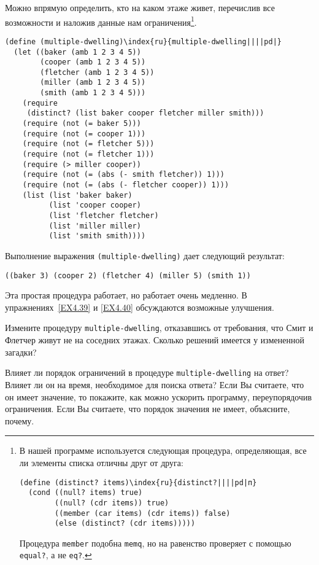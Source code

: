 Можно впрямую определить, кто на каком этаже живет,
перечислив все возможности и наложив данные нам ограничения\footnote{В 
нашей программе используется следующая процедура,
определяющая, все ли элементы списка отличны друг от друга:

\begin{Verbatim}
(define (distinct? items)\index{ru}{distinct?||||pd|п}
  (cond ((null? items) true)
        ((null? (cdr items)) true)
        ((member (car items) (cdr items)) false)
        (else (distinct? (cdr items)))))
\end{Verbatim}
Процедура {\tt member}
подобна {\tt memq}, но
на равенство проверяет с помощью {\tt equal?}, а не
{\tt eq?}.}.

\begin{Verbatim}[fontsize=\small]
(define (multiple-dwelling)\index{ru}{multiple-dwelling||||pd|}
  (let ((baker (amb 1 2 3 4 5))
        (cooper (amb 1 2 3 4 5))
        (fletcher (amb 1 2 3 4 5))
        (miller (amb 1 2 3 4 5))
        (smith (amb 1 2 3 4 5)))
    (require
     (distinct? (list baker cooper fletcher miller smith)))
    (require (not (= baker 5)))
    (require (not (= cooper 1)))
    (require (not (= fletcher 5)))
    (require (not (= fletcher 1)))
    (require (> miller cooper))
    (require (not (= (abs (- smith fletcher)) 1)))
    (require (not (= (abs (- fletcher cooper)) 1)))
    (list (list 'baker baker)
          (list 'cooper cooper)
          (list 'fletcher fletcher)
          (list 'miller miller)
          (list 'smith smith))))
\end{Verbatim}

Выполнение выражения {\tt (multiple-dwelling)}
дает следующий результат:

\begin{Verbatim}[fontsize=\small]
((baker 3) (cooper 2) (fletcher 4) (miller 5) (smith 1))
\end{Verbatim}
Эта простая процедура работает, но работает очень медленно.  В
упражнениях~\ref{EX4.39} и \ref{EX4.40}
обсуждаются возможные улучшения.

\begin{exercise}{4.38}%
\label{EX4.38}%
Измените процедуру {\tt multiple-dwelling},
отказавшись от требования, что Смит и Флетчер живут не на соседних
этажах.  Сколько решений имеется у измененной загадки?
\end{exercise}

\begin{exercise}{4.39}%
\label{EX4.39}%
Влияет ли порядок ограничений в процедуре
{\tt multiple-dwelling} на ответ?  Влияет ли он на время,
необходимое для поиска ответа?  Если Вы считаете, что он имеет
значение, то покажите, как можно ускорить программу, переупорядочив
ограничения.  Если Вы считаете, что порядок значения не имеет,
объясните, почему.
\end{exercise}

